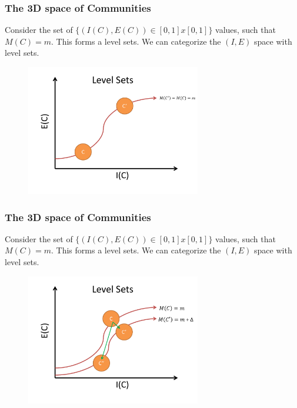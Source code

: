 \documentclass{beamer}
\begin{document}
\begin{frame}\frametitle{The 3D space of Communities}
Consider the set of $\{ (I(C), E(C)) \in [0, 1]x[0, 1]\}$ values, such that $M(C) = m$.  This forms a level sets.  We can categorize the $(I, E)$ space with level sets.
\begin{figure}
\includegraphics[width=3in]{Figures/communities_on_ls}
\end{figure}

\end{frame}

\begin{frame}\frametitle{The 3D space of Communities}
Consider the set of $\{ (I(C), E(C)) \in [0, 1]x[0, 1]\}$ values, such that $M(C) = m$.  This forms a level sets.  We can categorize the $(I, E)$ space with level sets.
\begin{figure}
\includegraphics[width=3in]{Figures/community_change}
\end{figure}

\end{frame}
\end{document}
